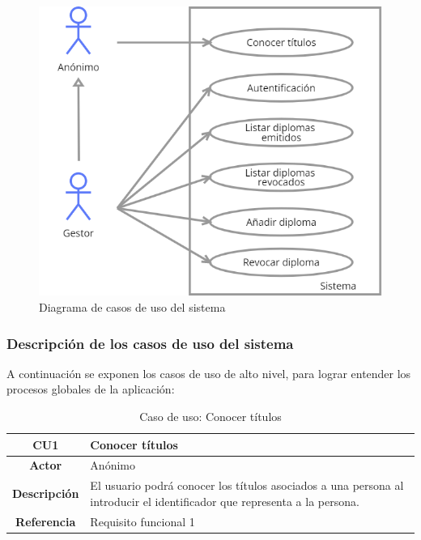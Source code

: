 \begin{figure}[htp]
\centering
\includegraphics[scale=0.6]{Graphics/useCasest}
\caption{Diagrama de casos de uso del sistema}
\label{fig:useCases}
\end{figure}

\subsubsection{Descripción de los casos de uso del sistema}
A continuación se exponen los casos de uso de alto nivel, para lograr entender los procesos globales de la aplicación:

\begin{table}[!h]
	\begin{center}
		\begin{tabular}{|c|p{10cm}|}
		\hline \textbf{CU1} & Conocer títulos \\ 
		\hline \textbf{Actor} & Anónimo \\ 
		\hline \textbf{Descripción} & El usuario podrá conocer los títulos asociados a una persona al introducir el identificador que representa a la persona.  \\ 
		\hline \textbf{Referencia} & Requisito funcional 1 \\ 
		\hline 
		\end{tabular}
		\caption{Caso de uso: Conocer títulos}
		\label{tab:CU1}
	\end{center}
\end{table}

